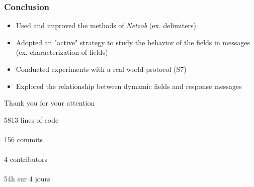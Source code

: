 \documentclass{beamer}
\newcounter{m} %
\newcounter{c} %
\begin{document}
\begin{frame}\frametitle{\bf Conclusion}
  \begin{itemize}
    \item Used and improved the methods of {\em Netzob} (ex. delimiters)
    \item Adopted an "active" strategy to study the behavior of the fields in messages (ex. characterization of fields)
    \item Conducted experiments with a real world protocol (S7)
    \item Explored the relationship between dymamic fields and response messages
  \end{itemize}
\end{frame}

\begin{frame}{Thank you for your attention}
  \begin{minipage}[c][][c]{.5\textwidth}
    5813 lines of code\\~\\156 commits\\~\\4 contributors\\~\\54h sur 4 jours\\~\\~\\\vspace{3cm}
  \end{minipage}\begin{minipage}[t]{.5\textwidth}
    \centering

\end{minipage}
\end{frame}
\end{document}
